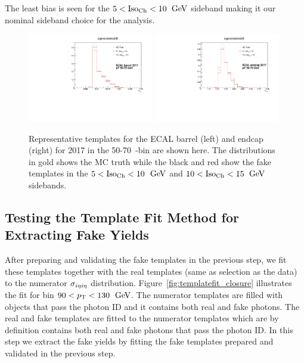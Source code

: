 
The least bias is seen for the $5 < \text{Iso}_{\text{Ch}} < 10$ $\,\text{Ge\hspace{-.08em}V}$ sideband making it our nominal sideband choice for the analysis.


\begin{figure}[!htbp]
  \centering
  \includegraphics[width=0.49\textwidth]{fig/MCtemplates_pT50To70EB2017.pdf}
  \includegraphics[width=0.49\textwidth]{fig/MCtemplates_pT50To70EE2017.pdf}
  \caption{Representative \sieie templates for the ECAL barrel (left) and endcap (right) for 2017 in the 50-70~\GeV \pt-bin are shown here. The distributions in gold shows the MC truth while the black and red show the fake templates in the $5 < \text{Iso}_{\text{Ch}} < 10$ $\,\text{Ge\hspace{-.08em}V}$ and $10 < \text{Iso}_{\text{Ch}} < 15$ $\,\text{Ge\hspace{-.08em}V}$ sidebands.}
  \label{fig:template_comparisons}
\end{figure}

\subsection{Testing the Template Fit Method for Extracting Fake Yields}

After preparing and validating the fake templates in the previous step, we fit these templates together with the real templates (same as selection as the data) to the numerator $\sigma_{i\eta i\eta}$ distribution. Figure~\ref{fig:templatefit_closure} illustrates the fit for \pt bin $90 < p_{\mathrm{T}} < 130$ $\,\text{Ge\hspace{-.08em}V}$. The numerator templates are filled with objects that pass the photon ID and it contains both real and fake photons. The real and fake templates are fitted to the numerator templates which are by definition contains both real and fake photons that pass the photon ID. In this step we extract the fake yields by fitting the fake templates prepared and validated in the previous step.


